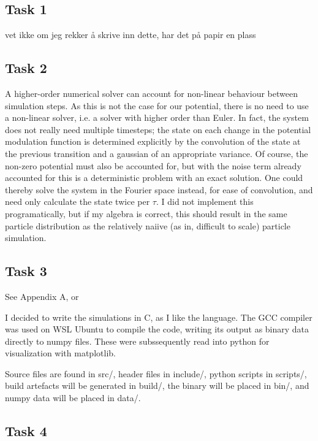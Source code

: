 \subsection*{Task 1}

vet ikke om jeg rekker å skrive inn dette, har det på papir en plass

\subsection*{Task 2}

A higher-order numerical solver can account for non-linear behaviour between 
simulation steps. As this is not the case for our potential, there is no need
to use a non-linear solver, i.e. a solver with higher order than Euler. In fact, 
the system does not really need multiple timesteps; the state on each change in 
the potential modulation function is determined explicitly by the convolution 
of the state at the previous transition and a gaussian of an appropriate variance.
Of course, the non-zero potential must also be accounted for, but with the noise
term already accounted for this is a deterministic problem with an exact solution.
One could thereby solve the system in the Fourier space instead, 
for ease of convolution, and need only calculate the state twice per $\tau$.
I did not implement this programatically, but if my algebra is correct,
this should result in the same particle distribution as the relatively naiive 
(as in, difficult to scale) particle simulation.

\subsection*{Task 3}

See Appendix A, or 
\href{
    https://www.github.com/viljarjf/nano/tree/main/TFY4235_numfys/2
    }{\color{blue}{the GitHub source}}

I decided to write the simulations in C, as I like the language. The GCC compiler
was used on WSL Ubuntu to compile the code, writing its output as binary data
directly to numpy files. These were subssequently read into python for 
visualization with matplotlib.

Source files are found in src/, header files in include/, 
python scripts in scripts/, build artefacts will be generated in build/, 
the binary will be placed in bin/, and numpy data will be placed in data/.

\subsection*{Task 4}

